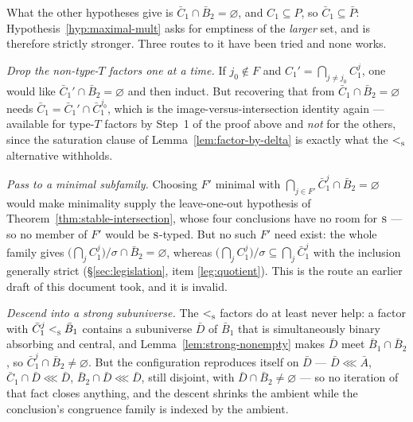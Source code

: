 \begin{hazard}\label{haz:maximal-mult}
What the other hypotheses give is
$\bar C_{1}\cap\bar B_{2}=\varnothing$, and $C_{1}\subseteq P$, so
$\bar C_{1}\subseteq\bar P$: Hypothesis~\ref{hyp:maximal-mult} asks for
emptiness of the \emph{larger} set, and is therefore strictly stronger. Three
routes to it have been tried and none works.

\emph{Drop the non-type-$T$ factors one at a time.} If $j_{0}\notin F$ and
$C_{1}'=\bigcap_{j\neq j_{0}}C_{1}^{j}$, one would like
$\bar C_{1}'\cap\bar B_{2}=\varnothing$ and then induct. But recovering that
from $\bar C_{1}\cap\bar B_{2}=\varnothing$ needs
$\bar C_{1}=\bar C_{1}'\cap\bar C_{1}^{j_{0}}$, which is the
image-versus-intersection identity again --- available for type-$T$ factors by
Step~1 of the proof above and \emph{not} for the others, since the saturation
clause of Lemma~\ref{lem:factor-by-delta} is exactly what the $<_{\textup{\textsc{s}}}^{}$
alternative withholds.

\emph{Pass to a minimal subfamily.} Choosing $F'$ minimal with
$\bigcap_{j\in F'}\bar C_{1}^{j}\cap\bar B_{2}=\varnothing$ would make
minimality supply the leave-one-out hypothesis of
Theorem~\ref{thm:stable-intersection}, whose four conclusions have no room for
$\textup{\textsc{s}}$ --- so no member of $F'$ would be $\textup{\textsc{s}}$-typed. But no such $F'$ need
exist: the whole family gives
$\bigl(\bigcap_{j}C_{1}^{j}\bigr)/\sigma\cap\bar B_{2}=\varnothing$, whereas
$\bigl(\bigcap_{j}C_{1}^{j}\bigr)/\sigma\subseteq\bigcap_{j}\bar C_{1}^{j}$
with the inclusion generally strict (\S\ref{sec:legislation}, item
\ref{leg:quotient}). This is the route an earlier draft of this document took,
and it is invalid.

\emph{Descend into a strong subuniverse.} The $<_{\textup{\textsc{s}}}^{}$ factors do at least
never help: a factor with $\bar C_{1}^{j}<_{\textup{\textsc{s}}}^{}\bar B_{1}$ contains a
subuniverse $\bar D$ of $\bar B_{1}$ that is simultaneously binary absorbing
and central, and Lemma~\ref{lem:strong-nonempty} makes $\bar D$ meet
$\bar B_{1}\cap\bar B_{2}$, so $\bar C_{1}^{j}\cap\bar B_{2}\neq\varnothing$.
But the configuration reproduces itself on $\bar D$ --- $\bar D\lll\bar A$,
$\bar C_{1}\cap\bar D\lll\bar D$, $\bar B_{2}\cap\bar D\lll\bar D$, still
disjoint, with $\bar D\cap\bar B_{2}\neq\varnothing$ --- so no iteration of
that fact closes anything, and the descent shrinks the ambient while the
conclusion's congruence family is indexed by the ambient.


\end{hazard}
